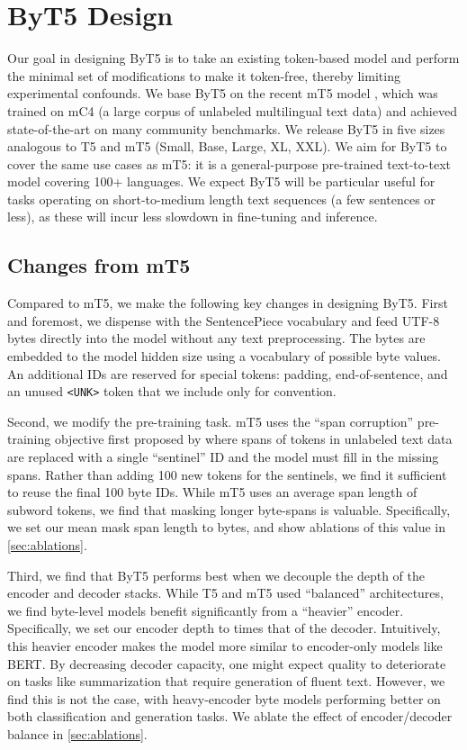\documentclass[11pt,a4paper]{article}
\begin{document}
\section{ByT5 Design}
\label{sec:byt5}

Our goal in designing ByT5 is to take an existing token-based model and perform the minimal set of modifications to make it token-free, thereby limiting experimental confounds.
We base ByT5 on the recent mT5 model \cite{mt5}, which was trained on mC4 (a large corpus of unlabeled multilingual text data) and achieved state-of-the-art on many community benchmarks.
We release ByT5 in five sizes analogous to T5 and mT5 (Small, Base, Large, XL, XXL).
We aim for ByT5 to cover the same use cases as mT5: it is a general-purpose pre-trained text-to-text model covering 100+ languages.
We expect ByT5 will be particular useful for tasks operating on short-to-medium length text sequences (a few sentences or less), as these will incur less slowdown in fine-tuning and inference.

\subsection{Changes from mT5}

Compared to mT5, we make the following key changes in designing ByT5. First and foremost, we dispense with the SentencePiece \cite{kudo-richardson-2018-sentencepiece} vocabulary and feed \mbox{UTF-8} bytes directly into the model without any text preprocessing. The bytes are embedded to the model hidden size using a vocabulary of  possible byte values. An additional  IDs are reserved for special tokens: padding, end-of-sentence, and an unused \texttt{<UNK>} token that we include only for convention.

Second, we modify the pre-training task.
mT5 uses the ``span corruption'' pre-training objective first proposed by \citet{raffel-2020-t5} where spans of tokens in unlabeled text data are replaced with a single ``sentinel'' ID and the model must fill in the missing spans.
Rather than adding 100 new tokens for the sentinels, we find it sufficient to reuse the final 100 byte IDs.
While mT5 uses an average span length of  subword tokens, we find that masking longer byte-spans is valuable.
Specifically, we set our mean mask span length to  bytes, and show ablations of this value in \cref{sec:ablations}.

Third, we find that ByT5 performs best when we decouple the depth of the encoder and decoder stacks. While T5 and mT5 used ``balanced'' architectures, we find byte-level models benefit significantly from a ``heavier'' encoder. Specifically, we set our encoder depth to  times that of the decoder. Intuitively, this heavier encoder makes the model more similar to encoder-only models like BERT\@. By decreasing decoder capacity, one might expect quality to deteriorate on tasks like summarization that require generation of fluent text. However, we find this is not the case, with heavy-encoder byte models performing better on both classification and generation tasks. We ablate the effect of encoder/decoder balance in \cref{sec:ablations}.
\end{document}

